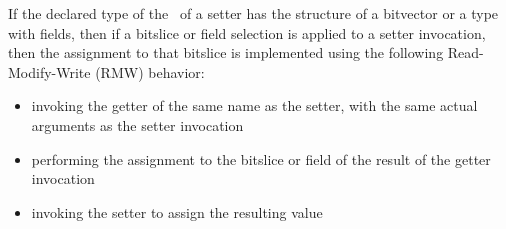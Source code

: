If the declared type of the \rhsexpression\ of a setter has the structure of a
bitvector or a type with fields, then if a bitslice or field selection is
applied to a setter invocation, then the assignment to that bitslice is
implemented using the following Read-Modify-Write (RMW) behavior:
\begin{itemize}
    \item invoking the getter of the same name as the setter, with the same actual
    arguments as the setter invocation
    \item performing the assignment to the bitslice or field of the result of the
    getter invocation
    \item invoking the setter to assign the resulting value
\end{itemize}
